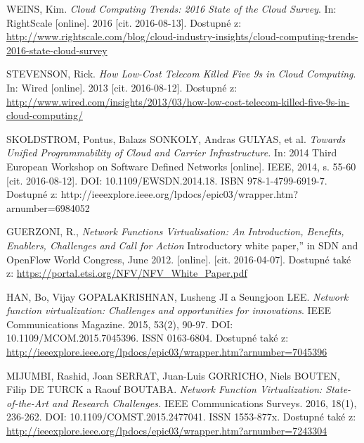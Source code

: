 
\renewcommand{\appendixname}{Literatura}%

  
\begin{thebibliography}{10}

WEINS, Kim. \emph{Cloud Computing Trends: 2016 State of the Cloud Survey}. In: RightScale [online]. 2016 [cit. 2016-08-13]. Dostupné z: \url{http://www.rightscale.com/blog/cloud-industry-insights/cloud-computing-trends-2016-state-cloud-survey}

STEVENSON, Rick. \emph{How Low-Cost Telecom Killed Five 9s in Cloud Computing}. In: Wired [online]. 2013 [cit. 2016-08-12]. Dostupné z: \url{http://www.wired.com/insights/2013/03/how-low-cost-telecom-killed-five-9s-in-cloud-computing/}

SKOLDSTROM, Pontus, Balazs SONKOLY, Andras GULYAS, et al. \emph{Towards Unified Programmability of Cloud and Carrier Infrastructure.} In: 2014 Third European Workshop on Software Defined Networks [online]. IEEE, 2014, s. 55-60 [cit. 2016-08-12]. DOI: 10.1109/EWSDN.2014.18. ISBN 978-1-4799-6919-7. Dostupné z: http://ieeexplore.ieee.org/lpdocs/epic03/wrapper.htm?arnumber=6984052

GUERZONI, R., \emph{Network Functions Virtualisation: An Introduction, Benefits, Enablers, Challenges and Call for Action} Introductory white paper,” in SDN and OpenFlow World Congress, June 2012. [online]. [cit. 2016-04-07]. Dostupné také z: \url{https://portal.etsi.org/NFV/NFV_White_Paper.pdf}

HAN, Bo, Vijay GOPALAKRISHNAN, Lusheng JI a Seungjoon LEE. \emph{Network function virtualization: Challenges and opportunities for innovations}. IEEE Communications Magazine. 2015, 53(2), 90-97. DOI: 10.1109/MCOM.2015.7045396. ISSN 0163-6804. Dostupné také z: \url{http://ieeexplore.ieee.org/lpdocs/epic03/wrapper.htm?arnumber=7045396}

MIJUMBI, Rashid, Joan SERRAT, Juan-Luis GORRICHO, Niels BOUTEN, Filip DE TURCK a Raouf BOUTABA. \emph{Network Function Virtualization: State-of-the-Art and Research Challenges.} IEEE Communications Surveys. 2016, 18(1), 236-262. DOI: 10.1109/COMST.2015.2477041. ISSN 1553-877x. Dostupné také z: \url{http://ieeexplore.ieee.org/lpdocs/epic03/wrapper.htm?arnumber=7243304}


\end{thebibliography}

